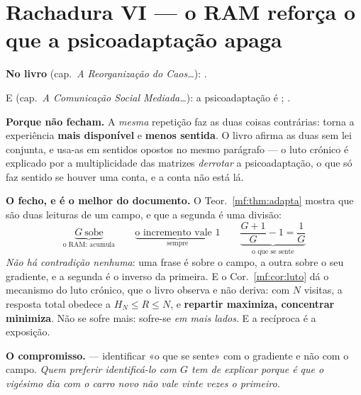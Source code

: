\documentclass[../livro.tex]{subfiles}
\begin{document}
\section{Rachadura VI --- o RAM reforça o que a psicoadaptação apaga}\label{mf:r6}

\noindent\textbf{No livro} (cap.~\emph{A Reorganização do Caos\dots}):
.

\noindent E (cap.~\emph{A Comunicação Social Mediada\dots}): a psicoadaptação é
; .

\medskip\noindent\textbf{Porque não fecham.} A \emph{mesma} repetição faz as duas
coisas contrárias: torna a experiência \textbf{mais disponível} e \textbf{menos
sentida}. O livro afirma as duas sem lei conjunta, e usa-as em sentidos opostos
no mesmo parágrafo --- o luto crónico é explicado por a multiplicidade das
matrizes \emph{derrotar} a psicoadaptação, o que só faz sentido se houver uma
conta, e a conta não está lá.

\medskip\noindent\textbf{O fecho, e é o melhor do documento.} O
Teor.~\ref{mf:thm:adapta} mostra que são duas leituras de um campo, e que a
segunda é uma divisão:
\[
\boxed{\;
\underbrace{G\ \text{sobe}}_{\text{o RAM: acumula}}
\qquad
\underbrace{\text{o incremento vale }1}_{\text{sempre}}
\qquad
\underbrace{\frac{G+1}{G}-1=\frac1G}_{\text{o que se sente}}
\;}
\]
\emph{Não há contradição nenhuma}: uma frase é sobre o campo, a outra sobre o seu
gradiente, e a segunda é o inverso da primeira. E o
Cor.~\ref{mf:cor:luto} dá o mecanismo do luto crónico, que o livro observa e não
deriva: com $N$ visitas, a resposta total obedece a $H_N\le R\le N$, e
\textbf{repartir maximiza, concentrar minimiza}. Não se sofre mais: sofre-se
\emph{em mais lados}. E a recíproca é a exposição.

\medskip\noindent\textbf{O compromisso.}  --- identificar «o que se sente»
com o gradiente e não com o campo. \emph{Quem preferir identificá-lo com $G$ tem
de explicar porque é que o vigésimo dia com o carro novo não vale vinte vezes o
primeiro.}
\end{document}
